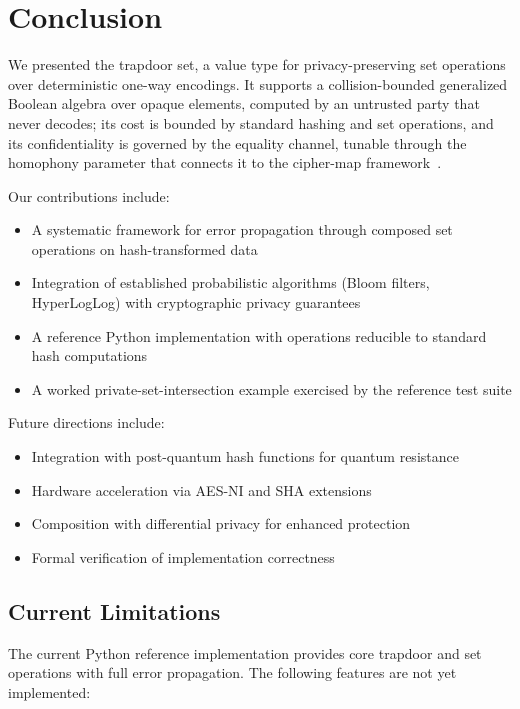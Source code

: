 \documentclass[10pt,conference]{IEEEtran}
\begin{document}
\section{Conclusion}
\label{sec:conclusion}

We presented the trapdoor set, a value type for privacy-preserving set operations over deterministic one-way encodings. It supports a collision-bounded generalized Boolean algebra over opaque elements, computed by an untrusted party that never decodes; its cost is bounded by standard hashing and set operations, and its confidentiality is governed by the equality channel, tunable through the homophony parameter that connects it to the cipher-map framework~\cite{cipher-maps}.

Our contributions include:
\begin{itemize}
\item A systematic framework for error propagation through composed set operations on hash-transformed data
\item Integration of established probabilistic algorithms (Bloom filters, HyperLogLog) with cryptographic privacy guarantees
\item A reference Python implementation with operations reducible to standard hash computations
\item A worked private-set-intersection example exercised by the reference test suite
\end{itemize}

Future directions include:
\begin{itemize}
\item Integration with post-quantum hash functions for quantum resistance
\item Hardware acceleration via AES-NI and SHA extensions
\item Composition with differential privacy for enhanced protection
\item Formal verification of implementation correctness
\end{itemize}

\subsection{Current Limitations}

The current Python reference implementation provides core trapdoor and set operations with full error propagation. The following features are not yet implemented:
\end{document}
